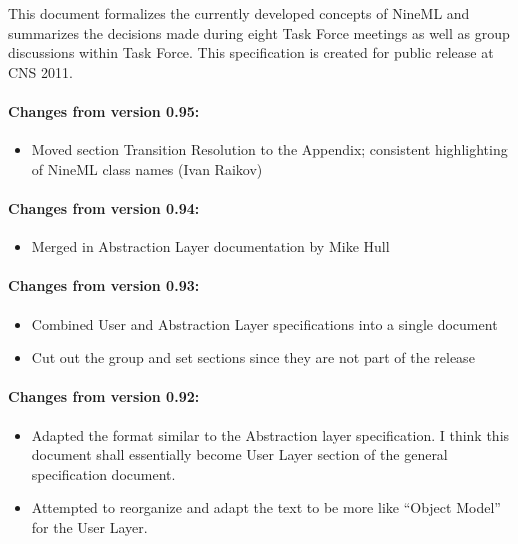 \documentclass{article}
\begin{document}
\abstract
This document formalizes the currently developed concepts of NineML and
summarizes the decisions made during eight Task Force meetings as well
as group discussions within Task Force. This specification is created for
public release at CNS 2011.

\vskip 1in

\paragraph{Changes from version 0.95:}
\begin{itemize}
\item Moved section Transition Resolution to the Appendix; consistent
  highlighting of NineML class names (Ivan Raikov)
\end{itemize}

\paragraph{Changes from version 0.94:}
\begin{itemize}
\item Merged in Abstraction Layer documentation by Mike Hull
\end{itemize}

\paragraph{Changes from version 0.93:}
\begin{itemize}
\item Combined User and Abstraction Layer specifications into a single document
\item Cut out the group and set sections since they are not part of the release
\end{itemize}

\paragraph{Changes from version 0.92:}
\begin{itemize}
\item Adapted the format similar to the Abstraction layer specification.
I think this document shall essentially become User Layer section of the
general specification document.
\item Attempted to reorganize and adapt the text to be more like ``Object
Model'' for the User Layer.
\end{itemize}
\end{document}
